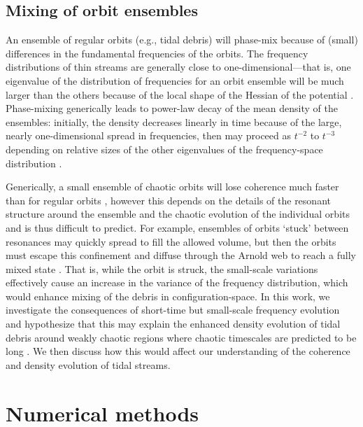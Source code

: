 \documentclass[letterpaper,12pt,preprint]{aastex}
\newcommand{\chchchanges}[1]{{\color{red} {#1}}}
\begin{document}
\subsection{Mixing of orbit ensembles}\label{sec:chaotic-mixing}

An ensemble of regular orbits (e.g., tidal debris) will phase-mix because of (small) differences in the fundamental frequencies of the orbits. The frequency distributions of thin streams are generally close to one-dimensional---that is, one eigenvalue of the distribution of frequencies for an orbit ensemble will be much larger than the others because of the local shape of the Hessian of the potential \citep{helmi99, sanders13a, bovy14}. Phase-mixing generically leads to power-law decay of the mean density of the ensembles: initially, the density decreases linearly in time because of the large, nearly one-dimensional spread in frequencies, then may proceed as $t^{-2}$ to $t^{-3}$ depending on relative sizes of the other eigenvalues of the frequency-space distribution \citep[e.g.,][]{helmi99, vogelsberger08}.

Generically, a small ensemble of chaotic orbits will lose coherence much faster than for regular orbits \cite[see, e.g.,][]{kandrup94, merritt96, kandrup03}, however this depends on the details of the resonant structure around the ensemble and the chaotic evolution of the individual orbits and is thus difficult to predict. For example, ensembles of orbits `stuck' between resonances may quickly spread to fill the allowed volume, but then the orbits must escape this confinement and diffuse through the Arnold web to reach a fully mixed state \citep{merritt96}. \chchchanges{That is, while the orbit is struck, the small-scale variations effectively cause an increase in the variance of the frequency distribution, which would enhance mixing of the debris in configuration-space.} In this work, we investigate the consequences of short-time but small-scale frequency evolution and hypothesize that this may explain the enhanced density evolution of tidal debris around weakly chaotic regions where chaotic timescales are predicted to be long \citep[e.g.,][]{pearson15}. We then discuss how this would affect our understanding of the coherence and density evolution of tidal streams.

\section{Numerical methods}\label{sec:methods}
\end{document}
